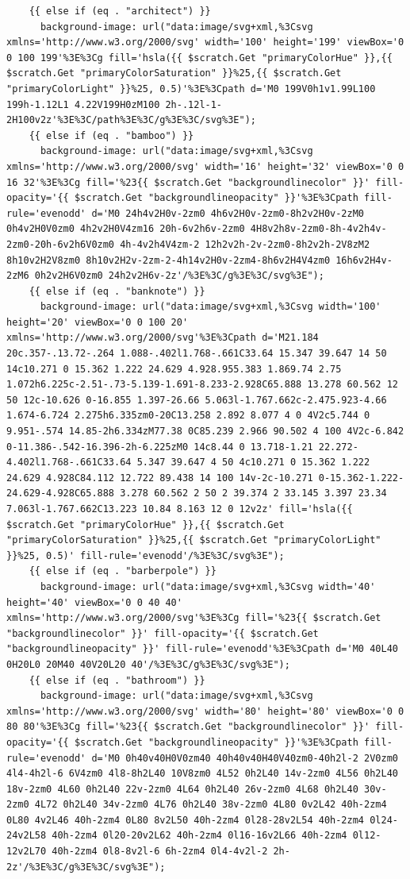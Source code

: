 \documentclass[11pt]{article}
\begin{document}
\begin{enumerate}
\begin{verbatim}
    {{ else if (eq . "architect") }}
      background-image: url("data:image/svg+xml,%3Csvg xmlns='http://www.w3.org/2000/svg' width='100' height='199' viewBox='0 0 100 199'%3E%3Cg fill='hsla({{ $scratch.Get "primaryColorHue" }},{{ $scratch.Get "primaryColorSaturation" }}%25,{{ $scratch.Get "primaryColorLight" }}%25, 0.5)'%3E%3Cpath d='M0 199V0h1v1.99L100 199h-1.12L1 4.22V199H0zM100 2h-.12l-1-2H100v2z'%3E%3C/path%3E%3C/g%3E%3C/svg%3E");
    {{ else if (eq . "bamboo") }}
      background-image: url("data:image/svg+xml,%3Csvg xmlns='http://www.w3.org/2000/svg' width='16' height='32' viewBox='0 0 16 32'%3E%3Cg fill='%23{{ $scratch.Get "backgroundlinecolor" }}' fill-opacity='{{ $scratch.Get "backgroundlineopacity" }}'%3E%3Cpath fill-rule='evenodd' d='M0 24h4v2H0v-2zm0 4h6v2H0v-2zm0-8h2v2H0v-2zM0 0h4v2H0V0zm0 4h2v2H0V4zm16 20h-6v2h6v-2zm0 4H8v2h8v-2zm0-8h-4v2h4v-2zm0-20h-6v2h6V0zm0 4h-4v2h4V4zm-2 12h2v2h-2v-2zm0-8h2v2h-2V8zM2 8h10v2H2V8zm0 8h10v2H2v-2zm-2-4h14v2H0v-2zm4-8h6v2H4V4zm0 16h6v2H4v-2zM6 0h2v2H6V0zm0 24h2v2H6v-2z'/%3E%3C/g%3E%3C/svg%3E");
    {{ else if (eq . "banknote") }}
      background-image: url("data:image/svg+xml,%3Csvg width='100' height='20' viewBox='0 0 100 20' xmlns='http://www.w3.org/2000/svg'%3E%3Cpath d='M21.184 20c.357-.13.72-.264 1.088-.402l1.768-.661C33.64 15.347 39.647 14 50 14c10.271 0 15.362 1.222 24.629 4.928.955.383 1.869.74 2.75 1.072h6.225c-2.51-.73-5.139-1.691-8.233-2.928C65.888 13.278 60.562 12 50 12c-10.626 0-16.855 1.397-26.66 5.063l-1.767.662c-2.475.923-4.66 1.674-6.724 2.275h6.335zm0-20C13.258 2.892 8.077 4 0 4V2c5.744 0 9.951-.574 14.85-2h6.334zM77.38 0C85.239 2.966 90.502 4 100 4V2c-6.842 0-11.386-.542-16.396-2h-6.225zM0 14c8.44 0 13.718-1.21 22.272-4.402l1.768-.661C33.64 5.347 39.647 4 50 4c10.271 0 15.362 1.222 24.629 4.928C84.112 12.722 89.438 14 100 14v-2c-10.271 0-15.362-1.222-24.629-4.928C65.888 3.278 60.562 2 50 2 39.374 2 33.145 3.397 23.34 7.063l-1.767.662C13.223 10.84 8.163 12 0 12v2z' fill='hsla({{ $scratch.Get "primaryColorHue" }},{{ $scratch.Get "primaryColorSaturation" }}%25,{{ $scratch.Get "primaryColorLight" }}%25, 0.5)' fill-rule='evenodd'/%3E%3C/svg%3E");
    {{ else if (eq . "barberpole") }}
      background-image: url("data:image/svg+xml,%3Csvg width='40' height='40' viewBox='0 0 40 40' xmlns='http://www.w3.org/2000/svg'%3E%3Cg fill='%23{{ $scratch.Get "backgroundlinecolor" }}' fill-opacity='{{ $scratch.Get "backgroundlineopacity" }}' fill-rule='evenodd'%3E%3Cpath d='M0 40L40 0H20L0 20M40 40V20L20 40'/%3E%3C/g%3E%3C/svg%3E");
    {{ else if (eq . "bathroom") }}
      background-image: url("data:image/svg+xml,%3Csvg xmlns='http://www.w3.org/2000/svg' width='80' height='80' viewBox='0 0 80 80'%3E%3Cg fill='%23{{ $scratch.Get "backgroundlinecolor" }}' fill-opacity='{{ $scratch.Get "backgroundlineopacity" }}'%3E%3Cpath fill-rule='evenodd' d='M0 0h40v40H0V0zm40 40h40v40H40V40zm0-40h2l-2 2V0zm0 4l4-4h2l-6 6V4zm0 4l8-8h2L40 10V8zm0 4L52 0h2L40 14v-2zm0 4L56 0h2L40 18v-2zm0 4L60 0h2L40 22v-2zm0 4L64 0h2L40 26v-2zm0 4L68 0h2L40 30v-2zm0 4L72 0h2L40 34v-2zm0 4L76 0h2L40 38v-2zm0 4L80 0v2L42 40h-2zm4 0L80 4v2L46 40h-2zm4 0L80 8v2L50 40h-2zm4 0l28-28v2L54 40h-2zm4 0l24-24v2L58 40h-2zm4 0l20-20v2L62 40h-2zm4 0l16-16v2L66 40h-2zm4 0l12-12v2L70 40h-2zm4 0l8-8v2l-6 6h-2zm4 0l4-4v2l-2 2h-2z'/%3E%3C/g%3E%3C/svg%3E");

\end{verbatim}
\end{enumerate}
\end{document}
